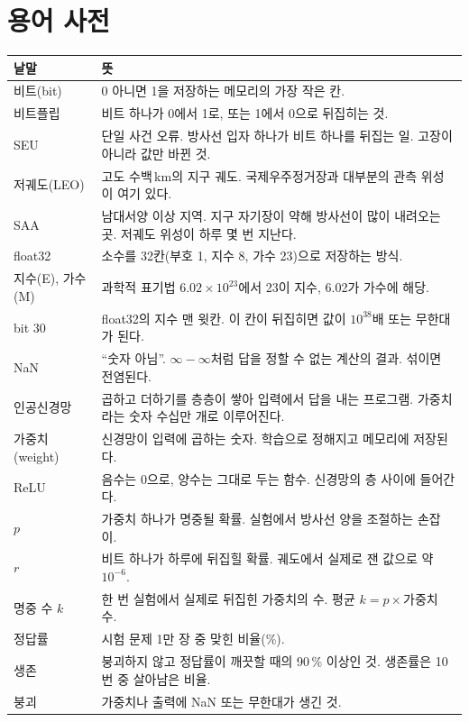 \documentclass[11pt,a4paper]{article}
\begin{document}
\section{용어 사전}
\begin{table}[H]
  \centering\small
  \begin{tabular}{lp{11.2cm}}
    \toprule
    낱말 & 뜻 \\
    \midrule
    비트(bit) & 0 아니면 1을 저장하는 메모리의 가장 작은 칸. \\
    비트플립 & 비트 하나가 0에서 1로, 또는 1에서 0으로 뒤집히는 것. \\
    SEU & 단일 사건 오류. 방사선 입자 하나가 비트 하나를 뒤집는 일. 고장이 아니라 값만 바뀐 것. \\
    저궤도(LEO) & 고도 수백\,km의 지구 궤도. 국제우주정거장과 대부분의 관측 위성이 여기 있다. \\
    SAA & 남대서양 이상 지역. 지구 자기장이 약해 방사선이 많이 내려오는 곳. 저궤도 위성이 하루 몇 번 지난다. \\
    float32 & 소수를 32칸(부호 1, 지수 8, 가수 23)으로 저장하는 방식. \\
    지수(E), 가수(M) & 과학적 표기법 $6.02\times10^{23}$에서 23이 지수, 6.02가 가수에 해당. \\
    bit 30 & float32의 지수 맨 윗칸. 이 칸이 뒤집히면 값이 $10^{38}$배 또는 무한대가 된다. \\
    NaN & ``숫자 아님''. $\infty-\infty$처럼 답을 정할 수 없는 계산의 결과. 섞이면 전염된다. \\
    인공신경망 & 곱하고 더하기를 층층이 쌓아 입력에서 답을 내는 프로그램. 가중치라는 숫자 수십만 개로 이루어진다. \\
    가중치(weight) & 신경망이 입력에 곱하는 숫자. 학습으로 정해지고 메모리에 저장된다. \\
    ReLU & 음수는 0으로, 양수는 그대로 두는 함수. 신경망의 층 사이에 들어간다. \\
    $p$ & 가중치 하나가 명중될 확률. 실험에서 방사선 양을 조절하는 손잡이. \\
    $r$ & 비트 하나가 하루에 뒤집힐 확률. 궤도에서 실제로 잰 값으로 약 $10^{-6}$. \\
    명중 수 $k$ & 한 번 실험에서 실제로 뒤집힌 가중치의 수. 평균 $k=p\times$가중치 수. \\
    정답률 & 시험 문제 1만 장 중 맞힌 비율(\%). \\
    생존 & 붕괴하지 않고 정답률이 깨끗할 때의 90\,\% 이상인 것. 생존률은 10번 중 살아남은 비율. \\
    붕괴 & 가중치나 출력에 NaN 또는 무한대가 생긴 것. \\

\end{tabular}
\end{table}
\end{document}
